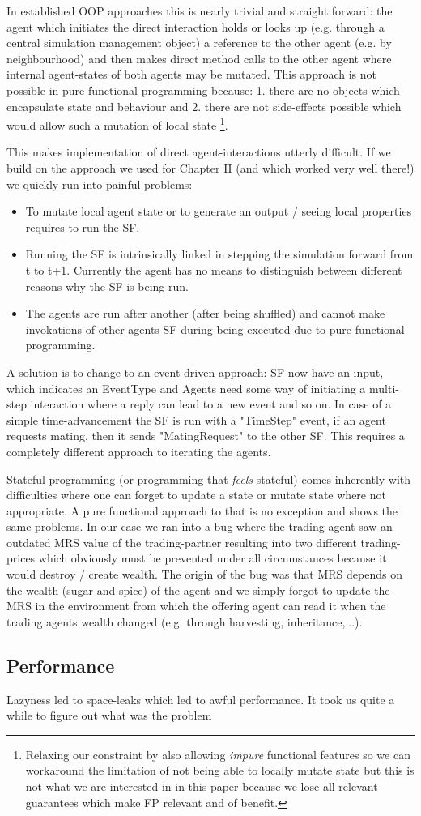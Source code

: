 In established OOP approaches this is nearly trivial and straight forward: the agent which initiates the direct interaction holds or looks up (e.g. through a central simulation management object) a reference to the other agent (e.g. by neighbourhood) and then makes direct method calls to the other agent where internal agent-states of both agents may be mutated.
This approach is not possible in pure functional programming because: 1. there are no objects which encapsulate state and behaviour and 2. there are not side-effects possible which would allow such a mutation of local state \footnote{Relaxing our constraint by also allowing \textit{impure} functional features so we can workaround the limitation of not being able to locally mutate state but this is not what we are interested in in this paper because we lose all relevant guarantees which make FP relevant and of benefit.}. 

This makes implementation of direct agent-interactions utterly difficult.
If we build on the approach we used for Chapter II (and which worked very well there!) we quickly run into painful problems:
\begin{itemize}
	\item To mutate local agent state or to generate an output / seeing local properties requires to run the SF. 
	\item Running the SF is intrinsically linked in stepping the simulation forward from t to t+1. Currently the agent has no means to distinguish between different reasons why the SF is being run.
	\item The agents are run after another (after being shuffled) and cannot make invokations of other agents SF during being executed due to pure functional programming.
\end{itemize}

A solution is to change to an event-driven approach: SF now have an input, which indicates an EventType and Agents need some way of initiating a multi-step interaction where a reply can lead to a new event and so on. In case of a simple time-advancement the SF is run with a "TimeStep" event, if an agent requests mating, then it sends "MatingRequest" to the other SF. This requires a completely different approach to iterating the agents.

Stateful programming (or programming that \textit{feels} stateful) comes inherently with difficulties where one can forget to update a state or mutate state where not appropriate. A pure functional approach to that is no exception and shows the same problems. In our case we ran into a bug where the trading agent saw an outdated MRS value of the trading-partner resulting into two different trading-prices which obviously must be prevented under all circumstances because it would destroy / create wealth. The origin of the bug was that MRS depends on the wealth (sugar and spice) of the agent and we simply forgot to update the MRS in the environment from which the offering agent can read it when the trading agents wealth changed (e.g. through harvesting, inheritance,...).

\subsection{Performance}
Lazyness led to space-leaks which led to awful performance. It took us quite a while to figure out what was the problem